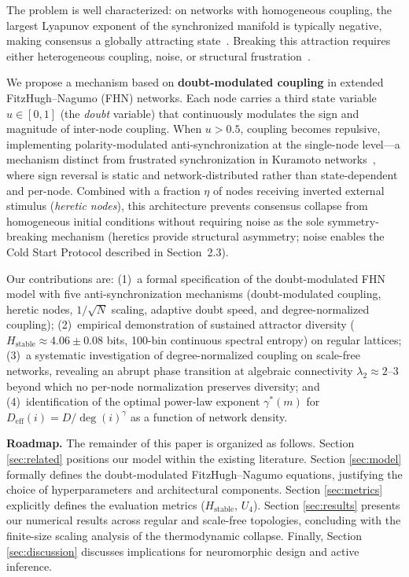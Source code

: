 \documentclass[11pt]{article}
\begin{document}
The problem is well characterized: on networks with homogeneous coupling, the largest Lyapunov exponent of the synchronized manifold is typically negative, making consensus a globally attracting state~\cite{jadbabaie2003}. Breaking this attraction requires either heterogeneous coupling, noise, or structural frustration~\cite{odor2024}.

We propose a mechanism based on \textbf{doubt-modulated coupling} in extended FitzHugh--Nagumo (FHN) networks. Each node carries a third state variable $u \in [0, 1]$ (the \textit{doubt} variable) that continuously modulates the sign and magnitude of inter-node coupling. When $u > 0.5$, coupling becomes repulsive, implementing polarity-modulated anti-synchronization at the single-node level---a mechanism distinct from frustrated synchronization in Kuramoto networks~\cite{odor2024}, where sign reversal is static and network-distributed rather than state-dependent and per-node. Combined with a fraction $\eta$ of nodes receiving inverted external stimulus (\textit{heretic nodes}), this architecture prevents consensus collapse from homogeneous initial conditions without requiring noise as the sole symmetry-breaking mechanism (heretics provide structural asymmetry; noise enables the Cold Start Protocol described in Section~2.3).

Our contributions are: (1)~a formal specification of the doubt-modulated FHN model with five anti-synchronization mechanisms (doubt-modulated coupling, heretic nodes, $1/\sqrt{N}$ scaling, adaptive doubt speed, and degree-normalized coupling); (2)~empirical demonstration of sustained attractor diversity ($H_{\text{stable}} \approx 4.06 \pm 0.08$ bits, 100-bin continuous spectral entropy) on regular lattices; (3)~a systematic investigation of degree-normalized coupling on scale-free networks, revealing an abrupt phase transition at algebraic connectivity $\lambda_2 \approx 2$--$3$ beyond which no per-node normalization preserves diversity; and (4)~identification of the optimal power-law exponent $\gamma^*(m)$ for $D_{\text{eff}}(i) = D/\deg(i)^\gamma$ as a function of network density.

\textbf{Roadmap.} The remainder of this paper is organized as follows. Section \ref{sec:related} positions our model within the existing literature. Section \ref{sec:model} formally defines the doubt-modulated FitzHugh--Nagumo equations, justifying the choice of hyperparameters and architectural components. Section \ref{sec:metrics} explicitly defines the evaluation metrics ($H_{\text{stable}}$, $U_4$). Section \ref{sec:results} presents our numerical results across regular and scale-free topologies, concluding with the finite-size scaling analysis of the thermodynamic collapse. Finally, Section \ref{sec:discussion} discusses implications for neuromorphic design and active inference.
\end{document}
